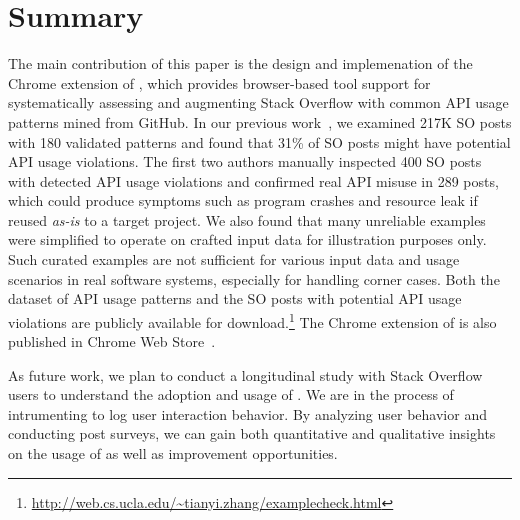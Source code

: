 \section{Summary}
\label{sec:summary}
The main contribution of this paper is the design and implemenation of the Chrome extension of {\tool}, which provides browser-based tool support for systematically assessing and augmenting Stack Overflow with common API usage patterns mined from GitHub. In our previous work~\cite{zhang2018code}, we examined 217K SO posts with 180 validated patterns and found that 31\% of SO posts might have potential API usage violations. The first two authors manually inspected 400 SO posts with detected API usage violations and confirmed real API misuse in 289 posts, which could produce symptoms such as program crashes and resource leak if reused {\em as-is} to a target project. We also found that many unreliable examples were simplified to operate on crafted input data for illustration purposes only. Such curated examples are not sufficient for various input data and usage scenarios in real software systems, especially for handling corner cases. Both the dataset of API usage patterns and the SO posts with potential API usage violations are publicly available for download.\footnote{\url{http://web.cs.ucla.edu/~tianyi.zhang/examplecheck.html}} The Chrome extension of {\tool} is also published in Chrome Web Store~\cite{examplecheck}.


As future work, we plan to conduct a longitudinal study with Stack Overflow users to understand the adoption and usage of {\tool}. We are in the process of intrumenting {\tool} to log user interaction behavior. By analyzing user behavior and conducting post surveys, we can gain both quantitative and qualitative insights on the usage of {\tool} as well as improvement opportunities. %
